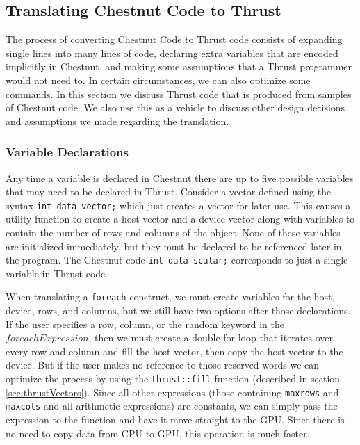 \documentclass[twocolumn]{article}
\renewcommand{\|}{\origbar} %
\newcommand{\code}[1]{\texttt{#1}}
\begin{document}
\subsection{Translating Chestnut Code to Thrust}
\fi
\label{sec:chestnutToThrust}

The process of converting Chestnut Code to Thrust code consists of expanding single lines into many lines of code, declaring extra variables that are encoded implicitly in Chestnut, and making some assumptions that a Thrust programmer would not need to. In certain circumstances, we can also optimize some commands. In this section we discuss Thrust code that is produced from samples of Chestnut code. We also use this as a vehicle to discuss other design decisions and assumptions we made regarding the translation.

\subsubsection{Variable Declarations}

Any time a variable is declared in Chestnut there are up to five possible variables that may need to be declared in Thrust. Consider a vector defined using the syntax \code{int data vector;} which just creates a vector for later use. This causes a utility function to create a host vector and a device vector along with variables to contain the number of rows and columns of the object. None of these variables are initialized immediately, but they must be declared to be referenced later in the program. The Chestnut code \code{int data scalar;} corresponds to just a single variable in Thrust code.

When translating a \code{foreach} construct, we must create variables for the host, device, rows, and columns, but we still have two options after those declarations. If the user specifies a row, column, or the random keyword in the $foreachExpression$, then we must create a double for-loop that iterates over every row and column and fill the host vector, then copy the host vector to the device. But if the user makes no reference to those reserved words we can optimize the process by using the \code{thrust::fill} function (described in section \ref{sec:thrustVectors}). Since all other expressions (those containing \code{maxrows} and \code{maxcols} and all arithmetic expressions) are constants, we can simply pass the expression to the function and have it move straight to the GPU. Since there is no need to copy data from CPU to GPU, this operation is much faster.
\end{document}

